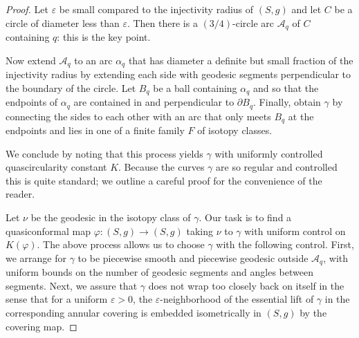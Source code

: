\documentclass[12pt,a4paper]{amsart}
\theoremstyle{definition}
\theoremstyle{plain}
\numberwithin{equation}{section}
\begin{document}
\begin{proof}
    Let $\varepsilon$ be small compared to the injectivity radius of $(S,g)$
    and let $C$ be a circle of diameter less than $\varepsilon$. Then there is a $(3/4)$-circle arc $\mathcal{A}_q$ of $C$ containing $q$: this is the key point.
    
    Now extend $\mathcal{A}_q$ to an arc $\alpha_q$ that has diameter a definite but small fraction of the injectivity radius by extending each side with geodesic segments perpendicular to the boundary of the circle.
    Let $B_q$ be a ball containing $\alpha_{q}$ and so that the endpoints of $\alpha_{q}$ are contained in and perpendicular to $\partial B_{q}$. Finally, obtain $\gamma$ by connecting the sides to each other with an arc that only meets $B_{q}$ at the endpoints and lies in one of a finite family $F$ of isotopy classes.

    We conclude by noting that this process yields $\gamma$ with uniformly controlled quascircularity constant $K$.
    Because the curves $\gamma$ are so regular and controlled this is quite standard; we outline a careful proof for the convenience of the reader.

    Let $\nu$ be the geodesic in the isotopy class of $\gamma$.
    Our task is to find a quasiconformal map $\varphi : (S,g) \to (S,g)$ taking $\nu$ to $\gamma$ with uniform control on $K(\varphi)$. 
    The above process allows us to choose $\gamma$ with the following control.
    First, we arrange for $\gamma$ to be piecewise smooth and piecewise geodesic outside $\mathcal{A}_q$, with uniform bounds on the number of geodesic segments and angles between segments.
    Next, we assure that $\gamma$ does not wrap too closely back on itself in the sense that for a uniform $\varepsilon > 0$, the $\varepsilon$-neighborhood of the essential lift of $\gamma$ in the corresponding annular covering is embedded isometrically in $(S,g)$ by the covering map.


\end{proof}
\end{document}
